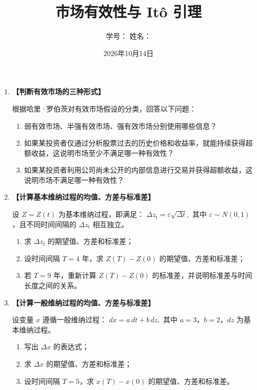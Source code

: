 \documentclass{article}
\author{学号：\underline{\hspace{4cm}} 姓名：\underline{\hspace{4cm}} }
\title{市场有效性与 Itô 引理}
\date{2026年10月14日}
\begin{document}
\maketitle

\begin{enumerate}[label=\textbf{\arabic*.}]

\item  {\bf{【判断有效市场的三种形式】}} %

根据哈里·罗伯茨对有效市场假设的分类，回答以下问题：

\begin{enumerate}[label=(\arabic*)]
    \item 弱有效市场、半强有效市场、强有效市场分别使用哪些信息？
    \item 如果某投资者仅通过分析股票过去的历史价格和收益率，就能持续获得超额收益，这说明市场至少不满足哪一种有效性？
    \item 如果某投资者利用公司尚未公开的内部信息进行交易并获得超额收益，这说明市场不满足哪一种有效性？
\end{enumerate}


\item  {\bf{【计算基本维纳过程的均值、方差与标准差】}} %

设 \(Z = Z(t)\) 为基本维纳过程，即满足：
\(
\Delta z_t = \varepsilon \sqrt{\Delta t}, 
\)
其中 \(\varepsilon \sim N(0,1)\)，且不同时间间隔的 \(\Delta z_t\) 相互独立。

\begin{enumerate}[label=(\arabic*)]
    \item 求 \(\Delta z_t\) 的期望值、方差和标准差；
    \item 设时间间隔 \(T = 4\) 年，求 \(Z(T) - Z(0)\) 的期望值、方差和标准差；
    \item 若 \(T = 9\) 年，重新计算 \(Z(T) - Z(0)\) 的标准差，并说明标准差与时间长度之间的关系。
\end{enumerate}



\item  {\bf{【计算一般维纳过程的均值、方差与标准差】}} %

设变量 \(x\) 遵循一般维纳过程：
\(
dx = a \, dt + b \, dz, 
\)
其中 \(a = 3\)，\(b = 2\)，\(dz\) 为基本维纳过程。

\begin{enumerate}[label=(\arabic*)]
    \item 写出 \(\Delta x\) 的表达式；
    \item 求 \(\Delta x\) 的期望值、方差和标准差；
    \item 设时间间隔 \(T = 5\)，求 \(x(T) - x(0)\) 的期望值、方差和标准差。
\end{enumerate}




\end{enumerate}
\end{document}
